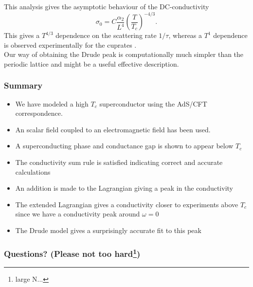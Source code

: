 \documentclass{beamer}
\begin{document}
\begin{frame}
This analysis gives the asymptotic behaviour of the DC-conductivity
\begin{equation}
 \sigma_0=C\frac{\alpha_2}{L^4}\left(\frac{T}{T_c}\right)^{-4/3}.
\end{equation}
This gives a $T^{4/3}$ dependence on the scattering rate $1/\tau$, whereas a $T^1$ dependence is observed experimentally for the cuprates \cite{drudeFit}.\\

Our way of obtaining the Drude peak is computationally much simpler than the periodic lattice and might be a useful effective description.\\
\end{frame}

\begin{frame}
\frametitle{Summary}
\begin{itemize}
\item We have modeled a high $T_c$ superconductor using the AdS/CFT correspondence.
\item An scalar field coupled to an electromagnetic field has been used.
\item A superconducting phase and conductance gap is shown to appear below $T_c$
\item The conductivity sum rule is satisfied indicating correct and accurate calculations
\item An addition is made to the Lagrangian giving a peak in the conductivity
\item The extended Lagrangian gives a conductivity closer to experiments above $T_c$ since we have a conductivity peak around $\omega=0$
\item The Drude model gives a surprisingly accurate fit to this peak
\end{itemize}

\end{frame}

\begin{frame}
\frametitle{Questions? (Please not too hard\footnote{large N...})}
\end{frame}

\begin{frame}


\end{frame}
\end{document}

